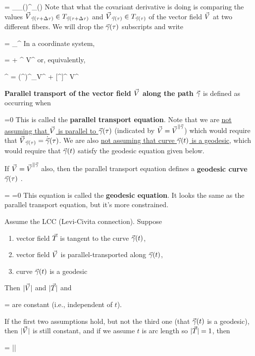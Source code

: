 \beq
{}
=
\nnabla_{\vecX_{\vgamma(\tau)}^{\para \vgamma}}\vecV_{\vgamma(\tau)}
\eeq
Note that what the covariant derivative
is doing is comparing the values 
${\vec{V}}_{{\vec{\gamma}}(\tau +\Delta\tau)}\in T_{{\vec{\gamma}}(\tau +\Delta\tau)}$
and
${\vec{V}}_{{\vec{\gamma}}(\tau)}\in T_{{\vec{\gamma}}(\tau)}$
of the vector field ${\vec{V}}$ at two
different fibers.
We will drop the ${\vec{\gamma}}(\tau)$
subscripts  and write

\beq
{}=
\nnabla_{\vecX^{\para \vgamma}}\vecV
\eeq
In a coordinate system,

\beq
{}
=
+\Gamma\indices{^\mu_{\nu\rho}}
\dot{\gamma}^\nu
V^\rho
\eeq
or, equivalently,

\beq
[\nnabla_{\vecX^{\para \vgamma}}\vecV]^\mu
=
({\vecX^{\para \vgamma}})^\nu \partial_\nu V^\mu
+
\Gamma\indices{^\mu_{\nu\rho}}
[{\vecX^{\para \vgamma}}]^\nu
V^\rho
\eeq

{\bf Parallel  transport of the vector 
field ${\vec{V}}$ along the path ${\vec{\gamma}}$ }
is defined as occurring when

\beq
{}=0
\eeq
This is called the {\bf parallel transport equation}.
Note that we are \ul{not assuming that
${\vec{V}}$ is parallel to ${\vec{\gamma}}(\tau)$}
(indicated by ${\vec{V}} = {\vec{V}}^{{\parallel} {\vec{\gamma}}}$)
which would require that ${\vec{V}}_{{\vec{\gamma}}(\tau)}=\dot{{\vec{\gamma}}}(\tau)$. 
We are also \ul{not assuming that curve ${\vec{\gamma}}(t)$ is a geodesic}, which 
would require  
that ${\vec{\gamma}}(t)$ satisfy the geodesic equation given below.

If ${\vec{V}}={\vec{V}}^{{\parallel} {\vec{\gamma}}}$ also, then 
the parallel transport equation 
defines a {\bf geodesic curve ${\vec{\gamma}}(\tau)$} .

\beq
{}=
=0
\eeq
This equation is called the {\bf geodesic equation}. It looks the same as the parallel transport equation, but
it's more constrained. 

\begin{claim}
Assume
the LCC (Levi-Civita connection).
Suppose 
\begin{enumerate}
 
\item vector field ${\vec{T}}$ is tangent to the curve
${\vec{\gamma}}(t)$,
\item 
vector field ${\vec{V}}$
is parallel-transported along ${\vec{\gamma}}(t)$,
\item curve ${\vec{\gamma}}(t)$ is a geodesic
\end{enumerate} 
 Then
$|{\vec{V}}|$ and $|{\vec{T}}|$
and

\beq
\cos \theta =
\frac{\av{\vecV, \vecT}}{|\vecV|\;|\vecT|}
\eeq
are constant (i.e., independent of $t$).

 If the 
first two assumptions hold,
but not the third one (that ${\vec{\gamma}}(t)$ is a geodesic), then 
$|{\vec{V}}|$ is still constant, and 
if we assume $t$ is arc length so $|{\vec{T}}|=1$, then

\beq
{}\cos\theta=
\frac{\av{\vecV, \nnabla_\vecT\vecT}}
{|\vecV|}
\eeq

\end{claim}
\proof

